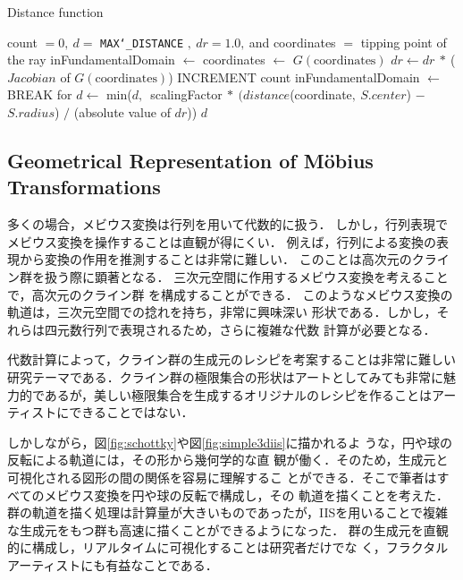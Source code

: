 \begin{algorithm}
 \caption{Distance function}
 \label{alg:iis3d}
 \begin{algorithmic}
  \REQUIRE count $= 0,~d = $ \texttt{MAX\char`_DISTANCE} $,~dr = 1.0,~$and coordinates $=$ tipping
  point of the ray
  \STATE inFundamentalDomain $\leftarrow$ \TRUE
  \STATE coordinates $\leftarrow$ $G(\text{coordinates})$
  \STATE $dr \leftarrow dr~*~$($Jacobian$ of $G(\text{coordinates})$)
  \STATE INCREMENT count
  \STATE inFundamentalDomain $\leftarrow$ \FALSE
  \ENDIF
  \ENDFOR
  \STATE BREAK for
  \ENDIF
  \ENDFOR
  \STATE $d \leftarrow$ min($d,$~scalingFactor$~*~(distance$(coordinate$,~S.center$) $-$
  $S.radius$) $/$ (absolute value of $dr$))
  \ENDFOR
  \RETURN $d$
 \end{algorithmic}
\end{algorithm}

\subsection{Geometrical Representation of M\"obius Transformations}

多くの場合，メビウス変換は行列を用いて代数的に扱う．
しかし，行列表現でメビウス変換を操作することは直観が得にくい．
例えば，行列による変換の表現から変換の作用を推測することは非常に難しい．
このことは高次元のクライン群を扱う際に顕著となる．
三次元空間に作用するメビウス変換を考えることで，高次元のクライン群
を構成することができる．
このようなメビウス変換の軌道は，三次元空間での捻れを持ち，非常に興味深い
形状である．しかし，それらは四元数行列で表現されるため，さらに複雑な代数
計算が必要となる．

代数計算によって，クライン群の生成元のレシピを考案することは非常に難しい
研究テーマである．クライン群の極限集合の形状はアートとしてみても非常に魅
力的であるが，美しい極限集合を生成するオリジナルのレシピを作ることはアー
ティストにできることではない．

しかしながら，図\ref{fig:schottky}や図\ref{fig:simple3diis}に描かれるよ
うな，円や球の反転による軌道には，その形から幾何学的な直
観が働く．そのため，生成元と可視化される図形の間の関係を容易に理解するこ
とができる．そこで筆者はすべてのメビウス変換を円や球の反転で構成し，その
軌道を描くことを考えた．
群の軌道を描く処理は計算量が大きいものであったが，IISを用いることで複雑
な生成元をもつ群も高速に描くことができるようになった．
群の生成元を直観的に構成し，リアルタイムに可視化することは研究者だけでな
く，フラクタルアーティストにも有益なことである．

